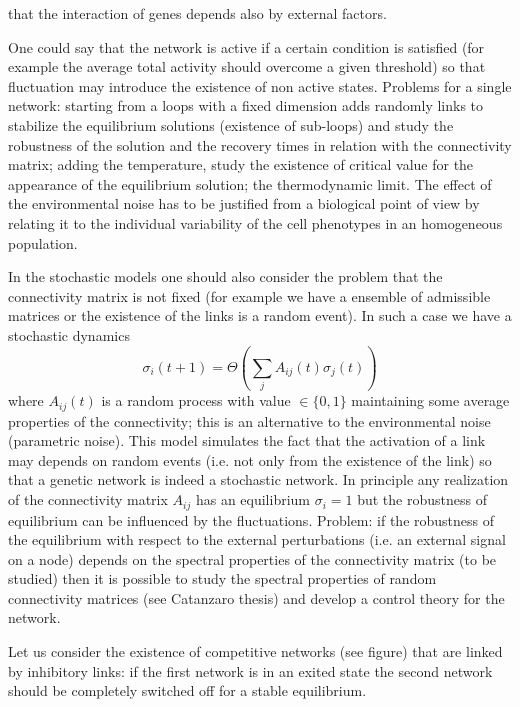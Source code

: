 that the interaction of genes depends also by external factors. \par\noindent  
One could say that the network is active if a certain condition is satisfied (for example the average
total activity should overcome a given threshold) so that fluctuation may introduce the existence of non active states.
Problems for a single network: starting from a loops with a fixed dimension adds randomly links to stabilize the
equilibrium solutions (existence of sub-loops)  and study the robustness of the solution and the recovery times in relation with
the connectivity matrix; adding the temperature, study the existence of critical value for the appearance of the equilibrium solution; the thermodynamic limit. The effect of the environmental noise has to be justified from a biological point of view by relating it
to the individual variability of the cell phenotypes in an homogeneous population.\par\noindent
In the stochastic models one should also consider the problem that the connectivity matrix is not fixed (for example we have
a ensemble of admissible matrices or the existence of the links is a random event). In such a case we have a stochastic
dynamics
\begin{equation}
\sigma_i(t+1)=\Theta\left (\sum_j A_{ij}(t)\sigma_j(t)\right )
\label{stocdyn2}
\end{equation}
where $A_{ij}(t)$ is a random process with value $\in\{0,1\}$ maintaining some average properties of the connectivity;
this is an alternative to the environmental noise (parametric noise). This model simulates the fact that the activation of a link
may depends on random events (i.e. not only from the existence of the link) so that a genetic network is indeed a stochastic
network. In principle any realization of the connectivity matrix $A_{ij}$ has an equilibrium $\sigma_i=1$ but the robustness
of equilibrium can be influenced by the fluctuations. Problem: if the robustness of the equilibrium with respect to the external
perturbations (i.e. an external signal on a node) depends on the spectral properties of the connectivity matrix (to be studied) then
it is possible to study the spectral properties of random connectivity matrices (see Catanzaro thesis) and develop a control theory
for the network. 
\par\noindent
Let us consider the existence of competitive networks (see figure) that are linked by inhibitory links: if the first network is
in an exited state the second network should be completely switched off for a stable equilibrium.
